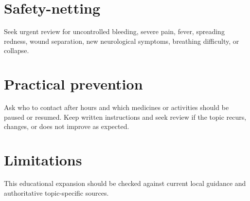 \section*{Safety-netting}
Seek urgent review for uncontrolled bleeding, severe pain, fever, spreading redness, wound separation, new neurological symptoms, breathing difficulty, or collapse.

\section*{Practical prevention}
Ask who to contact after hours and which medicines or activities should be paused or resumed. Keep written instructions and seek review if the topic recurs, changes, or does not improve as expected.

\section*{Limitations}
This educational expansion should be checked against current local guidance and authoritative topic-specific sources.
\clearpage
